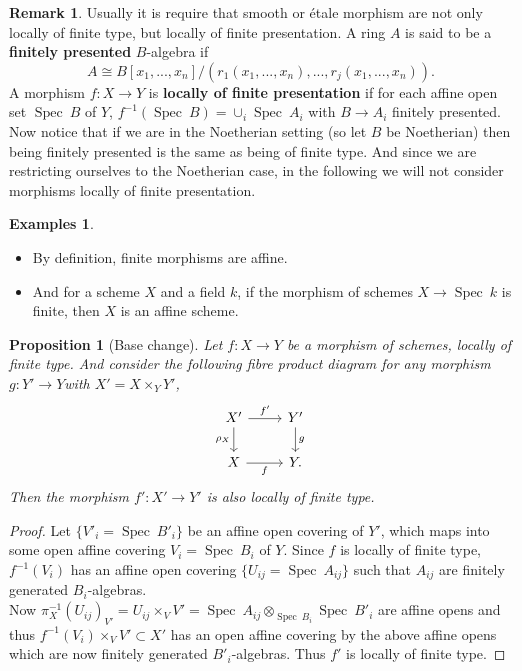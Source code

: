 \documentclass{article}
\theoremstyle{plain}
\newtheorem{proposition}[theorem]{Proposition}
\theoremstyle{definition}
\newtheorem{remark}{Remark}
\newtheorem{examples}[theorem]{Examples}
\DeclareMathOperator{\Spec}{Spec}
\begin{document}
\begin{remark}
\label{loc_finite_pres_loc_finite_type_noetherian}
    Usually it is require that smooth or \'etale morphism are not only locally of finite type, but locally of finite presentation.
    A ring $A$ is said to be a \textbf{finitely presented}  $B$-algebra if 
    $$A \cong B[x_1,...,x_n]/(r_1(x_1,...,x_n), ..., r_j(x_1,...,x_n)).$$
    A morphism $f:X\rightarrow Y$ is \textbf{locally of finite presentation} if for each affine open set $\Spec\:B$ of $Y$, $f^{-1}(\Spec\:B)=\cup_i\Spec\:A_i$ with $B\rightarrow A_i$ finitely presented.\\
    Now notice that if we are in the Noetherian setting (so let $B$ be Noetherian) then being finitely presented is the same as being of finite type.
    And since we are restricting ourselves to the Noetherian case, in the following we will not consider morphisms locally of finite presentation.
\end{remark}




\begin{examples}\textbf{ }
\begin{itemize}
    \item[$a)$] By definition, finite morphisms are affine.
    \item[$b)$] And for a scheme $X$ and a field $k$, if the morphism of schemes $X\rightarrow \Spec\:k$ is finite, then $X$ is an affine scheme.
\end{itemize}
\end{examples}



\begin{proposition}[Base change]
\label{base_change_locally_finite}
    Let $f:X\rightarrow Y$ be a morphism of schemes, locally of finite type. And consider the following fibre product diagram for any morphism $g:Y'\rightarrow Y$with $X'= X\times_YY'$,
    \[
    \begin{tikzcd}
        X'  \arrow[r,"f'"] \arrow[d, "\rho_X"'] & Y' \arrow[d,"g"] \\
        X \arrow[r,"f"'] &  Y.
    \end{tikzcd}
    \] 
    Then the morphism $f': X'\rightarrow Y'$ is also locally of finite type.
\end{proposition}
\begin{proof}
    Let $\{V'_i = \Spec\:B'_i\}$ be an affine open covering of $Y'$, which maps into some open affine covering $V_i = \Spec\:B_i$ of $Y$.
    Since $f$ is locally of finite type, $f^{-1}(V_i)$ has an affine open covering $\{U_{ij}=\Spec\:A_{ij}\}$ such that $A_{ij}$ are finitely generated $B_i$-algebras.\\
    Now $\pi_X^{-1}(U_{ij})_{V'} = U_{ij}\times_V V' = \Spec\:A_{ij}\otimes_{\Spec\:B_i}\Spec\:B'_i$ are affine opens and thus $f^{-1}(V_i)\times_VV' \subset X'$ has an open affine covering by the above affine opens which are now finitely generated $B'_i$-algebras. Thus $f'$ is locally of finite type.
\end{proof}
\end{document}

